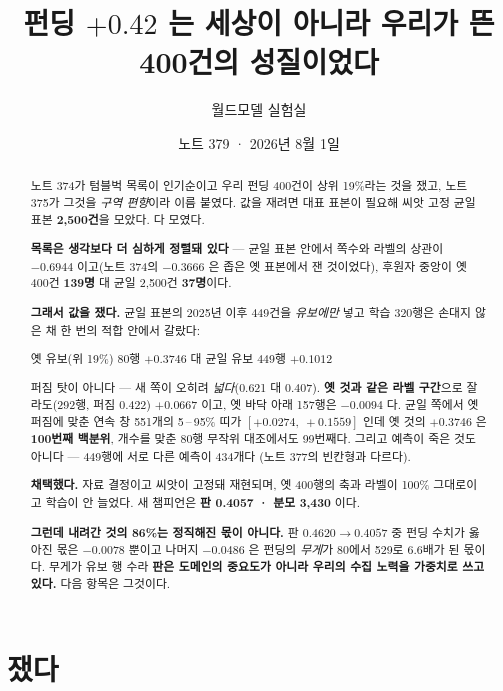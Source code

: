 \documentclass[11pt]{article}
\begin{document}
\title{펀딩 $+0.42$ 는 세상이 아니라 우리가 뜬 400건의 성질이었다}
\author{월드모델 실험실}
\date{노트 379 · 2026년 8월 1일}
\maketitle

\begin{abstract}
노트 374가 텀블벅 목록이 인기순이고 우리 펀딩 400건이 상위 19\%라는 것을
쟀고, 노트 375가 그것을 \emph{구역 편향}이라 이름 붙였다. 값을 재려면
대표 표본이 필요해 씨앗 고정 균일 표본 \textbf{2,500건}을 모았다. 다
모였다.

\textbf{목록은 생각보다 더 심하게 정렬돼 있다} --- 균일 표본 안에서
쪽수와 라벨의 상관이 $-0.6944$ 이고(노트 374의 $-0.3666$ 은 좁은 옛
표본에서 잰 것이었다), 후원자 중앙이 옛 400건 \textbf{139명} 대 균일
2,500건 \textbf{37명}이다.

\textbf{그래서 값을 쟀다.} 균일 표본의 2025년 이후 449건을 \emph{유보에만}
넣고 학습 320행은 손대지 않은 채 한 번의 적합 안에서 갈랐다:

\begin{center}
옛 유보(위 19\%) 80행 $\mathbf{+0.3746}$ \quad 대 \quad
균일 유보 449행 $\mathbf{+0.1012}$
\end{center}

퍼짐 탓이 아니다 --- 새 쪽이 오히려 \emph{넓다}(0.621 대 0.407).
\textbf{옛 것과 같은 라벨 구간}으로 잘라도(292행, 퍼짐 0.422) $+0.0667$
이고, 옛 바닥 아래 157행은 $-0.0094$ 다. 균일 쪽에서 옛 퍼짐에 맞춘 연속
창 551개의 5\,--\,95\% 띠가 $[+0.0274,\ +0.1559]$ 인데 옛 것의 $+0.3746$
은 \textbf{100번째 백분위}, 개수를 맞춘 80행 무작위 대조에서도 99번째다.
그리고 예측이 죽은 것도 아니다 --- 449행에 서로 다른 예측이 434개다
(노트 377의 빈칸형과 다르다).

\textbf{채택했다.} 자료 결정이고 씨앗이 고정돼 재현되며, 옛 400행의 축과
라벨이 100\% 그대로이고 학습이 안 늘었다. 새 챔피언은 \textbf{판 0.4057 ·
분모 3,430} 이다.

\textbf{그런데 내려간 것의 86\%는 정직해진 몫이 아니다.} 판 $0.4620 \to
0.4057$ 중 펀딩 수치가 옳아진 몫은 $-0.0078$ 뿐이고 나머지 $-0.0486$ 은
펀딩의 \emph{무게}가 80에서 529로 6.6배가 된 몫이다. 무게가 유보 행 수라
\textbf{판은 도메인의 중요도가 아니라 우리의 수집 노력을 가중치로 쓰고
있다.} 다음 항목은 그것이다.
\end{abstract}

\section{쟀다}
\end{document}

